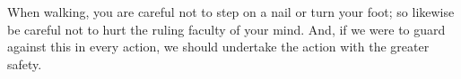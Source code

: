 When walking,  you are  careful not to  step on  a nail or  turn your  foot; so
likewise be  careful not to hurt  the ruling faculty  of your mind. And,  if we
were to guard against this in every action, we should undertake the action with
the greater safety.
